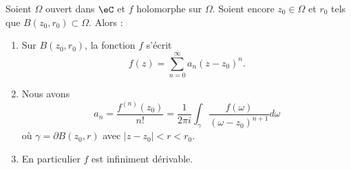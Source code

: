 \begin{theorem}     \label{ThomcPOdd}
	Soient \( \Omega\) ouvert dans \( \eC\) et \( f\) holomorphe sur \( \Omega\). Soient encore \( z_0\in \Omega\) et \( r_0\) tels que \( B(z_0,r_0)\subset \Omega\). Alors :
	\begin{enumerate}
		\item       \label{ITEMooYWSOooHJtxGr}
		      Sur \( B(z_0,r_0)\), la fonction \( f\) s'écrit
		      \begin{equation}
			      f(z)=\sum_{n=0}^{\infty}a_n(z-z_0)^n.
		      \end{equation}
		\item
		      Nous avons
		      \begin{equation}
			      a_n=\frac{ f^{(n)}(z_0) }{ n! }=\frac{1}{ 2\pi i }\int_{\gamma}\frac{ f(\omega) }{ (\omega-z_0)^{n+1} }d\omega
		      \end{equation}
		      où \( \gamma=\partial B(z_0,r)\) avec \( | z-z_0 |<r<r_0\).
		\item   \label{ItemMRRTooMChmuZ}
		      En particulier \( f\) est infiniment dérivable.
	\end{enumerate}
\end{theorem}

